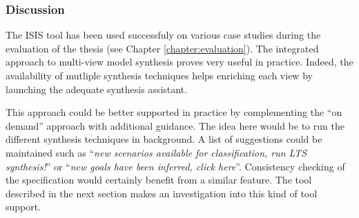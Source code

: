 \subsubsection*{Discussion}

The ISIS tool has been used successfuly on various case studies during the evaluation of the thesis (see Chapter \ref{chapter:evaluation}). The integrated approach to multi-view model synthesis proves very useful in practice. Indeed, the availability of mutliple synthesis techniques helps enriching each view by launching the adequate synthesis assistant.

This approach could be better supported in practice by complementing the ``on demand'' approach with additional guidance. The idea here would be to run the different synthesis techniques in background. A list of suggestions could be maintained such as ``\emph{new scenarios available for classification, run LTS synthesis!}'' or ``\emph{new goals have been inferred, click here}''. Consistency checking of the specification would certainly benefit from a similar feature. The tool described in the next section makes an investigation into this kind of tool support. 
